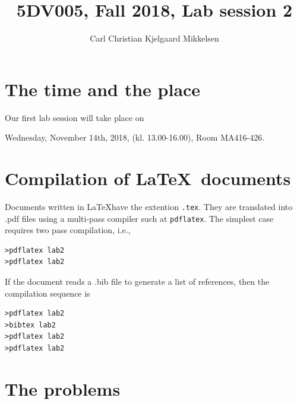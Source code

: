 \documentclass[a4paper,12pt]{article}
\newcounter{problem}
\begin{document}
\title{5DV005, Fall 2018, Lab session 2}
\author{Carl Christian Kjelgaard Mikkelsen}

\maketitle
\tableofcontents

\section{The time and the place}
Our first lab session will take place on
\begin{center}
Wednesday, November 14th, 2018, (kl. 13.00-16.00), Room MA416-426.
\end{center}

\section{Compilation of \LaTeX~documents}

Documents written in \LaTeX have the extention {\tt .tex}. They are translated into .pdf files using a multi-pass compiler such at {\tt pdflatex}. The simplest case requires two pass compilation, i.e.,
\begin{verbatim}
>pdflatex lab2
>pdflatex lab2
\end{verbatim}
If the document reads a .bib file to generate a list of references, then the compilation sequence is
\begin{verbatim}
>pdflatex lab2
>bibtex lab2         
>pdflatex lab2
>pdflatex lab2
\end{verbatim}
\newpage


\section{The problems}
\end{document}
